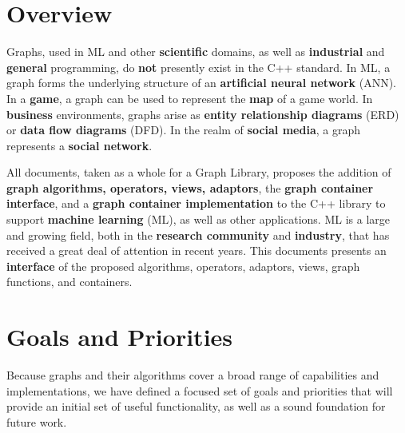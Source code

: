 
\section{Overview}

Graphs, used in ML and other \textbf{scientific} domains, as well as \textbf{industrial} and \textbf{general} programming, 
do \textbf{not} presently exist in the C++ standard. In ML, a graph forms the underlying structure of an \textbf{artificial neural network} (ANN). 
In a \textbf{game}, a graph can be used to represent the \textbf{map} of a game world. In \textbf{business} environments, graphs arise as 
\textbf{entity relationship diagrams} (ERD) or \textbf{data flow diagrams} (DFD). In the realm of \textbf{social media}, a graph represents a 
\textbf{social network}.

All documents, taken as a whole for a Graph Library, proposes the addition of \textbf{graph algorithms, operators, views, adaptors}, the 
\textbf{graph container interface}, and a \textbf{graph container implementation} to the C++ library to support \textbf{machine learning} (ML), 
as well as other applications. ML is a large and growing field, both in the \textbf{research community} and \textbf{industry}, that has 
received a great deal of attention in recent years. This documents presents an \textbf{interface} of the proposed algorithms, operators, adaptors,
views, graph functions, and containers.

\section{Goals and Priorities}

Because graphs and their algorithms cover a broad range of capabilities and implementations, we have defined a focused set of 
goals and priorities that will provide an initial set of useful functionality, as well as a sound foundation for future work.

